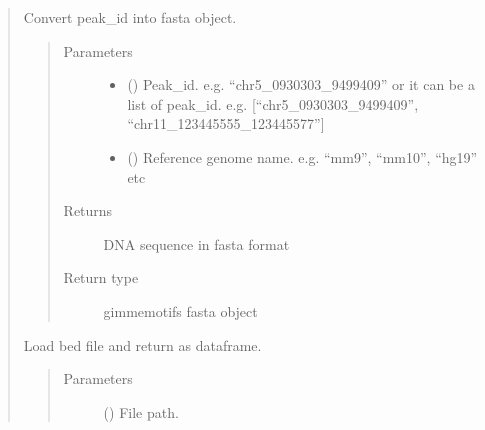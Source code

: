 \documentclass[letterpaper,10pt,english]{sphinxmanual}
\begin{document}
\begin{quote}
\begin{fulllineitems}
\end{fulllineitems}


\begin{fulllineitems}
\label{\detokenize{modules/celloracle.motif_analysis:celloracle.motif_analysis.peak2fasta}}
Convert peak\_id into fasta object.
\begin{quote}\begin{description}
\item[{Parameters}] \leavevmode\begin{itemize}
\item {} 
 () \textendash{} Peak\_id.  e.g. “chr5\_0930303\_9499409”
or it can be a list of peak\_id.  e.g. {[}“chr5\_0930303\_9499409”, “chr11\_123445555\_123445577”{]}

\item {} 
 () \textendash{} Reference genome name.   e.g. “mm9”, “mm10”, “hg19” etc

\end{itemize}

\item[{Returns}] \leavevmode
DNA sequence in fasta format

\item[{Return type}] \leavevmode
gimmemotifs fasta object

\end{description}\end{quote}

\end{fulllineitems}


\begin{fulllineitems}
\label{\detokenize{modules/celloracle.motif_analysis:celloracle.motif_analysis.read_bed}}
Load bed file and return as dataframe.
\begin{quote}\begin{description}
\item[{Parameters}] \leavevmode
{} () \textendash{} File path.


\end{description}
\end{quote}
\end{fulllineitems}
\end{quote}
\end{document}
